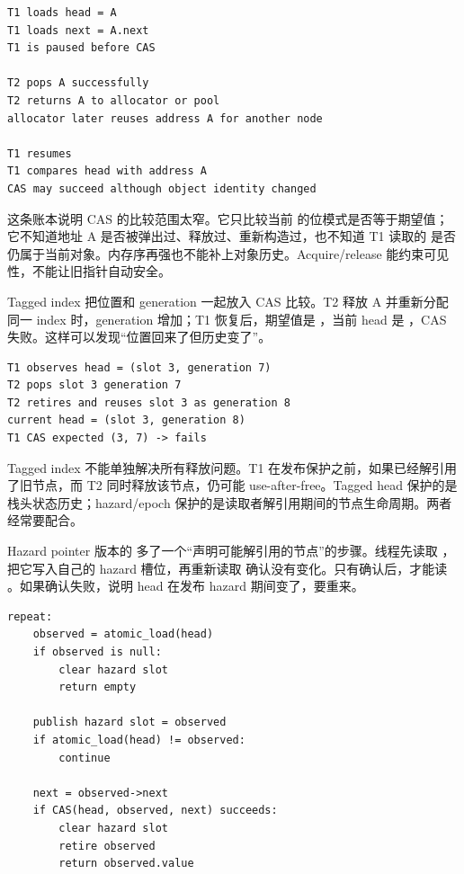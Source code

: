 \begin{lstlisting}[numbers=none,caption={不完整 pop 的语义事件链}]
T1 loads head = A
T1 loads next = A.next
T1 is paused before CAS

T2 pops A successfully
T2 returns A to allocator or pool
allocator later reuses address A for another node

T1 resumes
T1 compares head with address A
CAS may succeed although object identity changed
\end{lstlisting}

这条账本说明 CAS 的比较范围太窄。它只比较当前  的位模式是否等于期望值；它不知道地址 A 是否被弹出过、释放过、重新构造过，也不知道 T1 读取的  是否仍属于当前对象。内存序再强也不能补上对象历史。Acquire/release 能约束可见性，不能让旧指针自动安全。

Tagged index 把位置和 generation 一起放入 CAS 比较。T2 释放 A 并重新分配同一 index 时，generation 增加；T1 恢复后，期望值是 ，当前 head 是 ，CAS 失败。这样可以发现“位置回来了但历史变了”。

\begin{lstlisting}[numbers=none,caption={Tagged head 的 ABA 拒绝路径}]
T1 observes head = (slot 3, generation 7)
T2 pops slot 3 generation 7
T2 retires and reuses slot 3 as generation 8
current head = (slot 3, generation 8)
T1 CAS expected (3, 7) -> fails
\end{lstlisting}

Tagged index 不能单独解决所有释放问题。T1 在发布保护之前，如果已经解引用了旧节点，而 T2 同时释放该节点，仍可能 use-after-free。Tagged head 保护的是栈头状态历史；hazard/epoch 保护的是读取者解引用期间的节点生命周期。两者经常要配合。

Hazard pointer 版本的  多了一个“声明可能解引用的节点”的步骤。线程先读取 ，把它写入自己的 hazard 槽位，再重新读取  确认没有变化。只有确认后，才能读 。如果确认失败，说明 head 在发布 hazard 期间变了，要重来。

\begin{lstlisting}[numbers=none,caption={Hazard pointer pop 的语义伪代码}]
repeat:
    observed = atomic_load(head)
    if observed is null:
        clear hazard slot
        return empty

    publish hazard slot = observed
    if atomic_load(head) != observed:
        continue

    next = observed->next
    if CAS(head, observed, next) succeeds:
        clear hazard slot
        retire observed
        return observed.value
\end{lstlisting}

